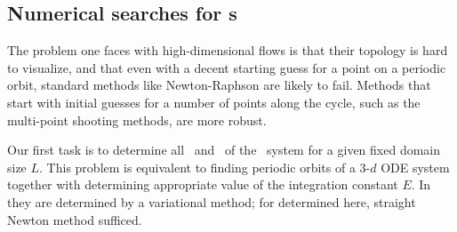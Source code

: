 {\subsection{Numerical searches for \rpo s}



The problem one faces with high-dimensional flows is
that their topology is hard to
visualize, and that even with a decent starting guess for a point on
a periodic orbit, standard methods like Newton-Raphson are likely to fail.
Methods that start with initial guesses for a number of points along the
cycle, such as the multi-point shooting methods,
are more robust.

  Our first task is to determine all \eqva\
and  \reqva\ of the \KS\ system for a given fixed domain size
$L$. This problem is equivalent to finding periodic orbits of a
3-$d$ ODE system  together with determining
appropriate value of the integration constant $E$. In
 they are
determined by a variational {\descent} method; for {\eqva}
determined here, straight Newton method sufficed.



}
